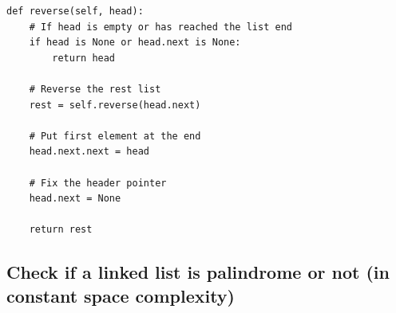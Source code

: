 \documentclass[a4paper,11pt]{book}
\begin{document}
\begin{lstlisting}
def reverse(self, head):
    # If head is empty or has reached the list end
    if head is None or head.next is None:
        return head

    # Reverse the rest list
    rest = self.reverse(head.next)

    # Put first element at the end
    head.next.next = head
    
    # Fix the header pointer
    head.next = None
    
    return rest
\end{lstlisting}

\subsection{Check if a linked list is palindrome or not (in constant space complexity)}
\vspace{5mm}
\end{document}
